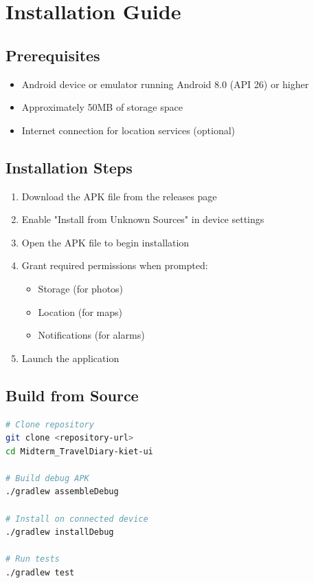 \documentclass[12pt,a4paper]{article}
\begin{document}
\section{Installation Guide}

\subsection{Prerequisites}
\begin{itemize}
    \item Android device or emulator running Android 8.0 (API 26) or higher
    \item Approximately 50MB of storage space
    \item Internet connection for location services (optional)
\end{itemize}

\subsection{Installation Steps}
\begin{enumerate}
    \item Download the APK file from the releases page
    \item Enable "Install from Unknown Sources" in device settings
    \item Open the APK file to begin installation
    \item Grant required permissions when prompted:
    \begin{itemize}
        \item Storage (for photos)
        \item Location (for maps)
        \item Notifications (for alarms)
    \end{itemize}
    \item Launch the application
\end{enumerate}

\subsection{Build from Source}
\begin{lstlisting}[language=bash, caption=Build Commands]
# Clone repository
git clone <repository-url>
cd Midterm_TravelDiary-kiet-ui

# Build debug APK
./gradlew assembleDebug

# Install on connected device
./gradlew installDebug

# Run tests
./gradlew test
\end{lstlisting}
\end{document}

